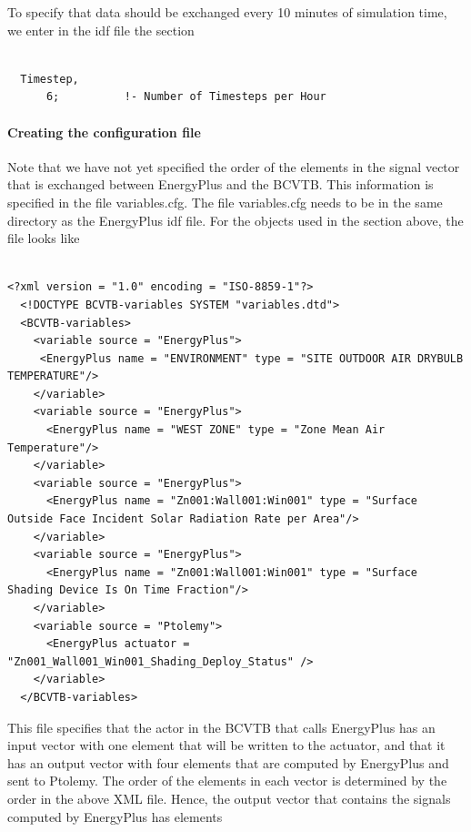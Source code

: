 To specify that data should be exchanged every 10 minutes of simulation time, we enter in the idf file the section

\begin{lstlisting}

  Timestep,
      6;          !- Number of Timesteps per Hour
\end{lstlisting}

\paragraph{\textbf{Creating the configuration file}}\label{creating-the-configuration-file-1}

Note that we have not yet specified the order of the elements in the signal vector that is exchanged between EnergyPlus and the BCVTB. This information is specified in the file variables.cfg. The file variables.cfg needs to be in the same directory as the EnergyPlus idf file. For the objects used in the section above, the file looks like

\begin{lstlisting}

<?xml version = "1.0" encoding = "ISO-8859-1"?>
  <!DOCTYPE BCVTB-variables SYSTEM "variables.dtd">
  <BCVTB-variables>
    <variable source = "EnergyPlus">
     <EnergyPlus name = "ENVIRONMENT" type = "SITE OUTDOOR AIR DRYBULB TEMPERATURE"/>
    </variable>
    <variable source = "EnergyPlus">
      <EnergyPlus name = "WEST ZONE" type = "Zone Mean Air Temperature"/>
    </variable>
    <variable source = "EnergyPlus">
      <EnergyPlus name = "Zn001:Wall001:Win001" type = "Surface Outside Face Incident Solar Radiation Rate per Area"/>
    </variable>
    <variable source = "EnergyPlus">
      <EnergyPlus name = "Zn001:Wall001:Win001" type = "Surface Shading Device Is On Time Fraction"/>
    </variable>
    <variable source = "Ptolemy">
      <EnergyPlus actuator = "Zn001_Wall001_Win001_Shading_Deploy_Status" />
    </variable>
  </BCVTB-variables>
\end{lstlisting}

This file specifies that the actor in the BCVTB that calls EnergyPlus has an input vector with one element that will be written to the actuator, and that it has an output vector with four elements that are computed by EnergyPlus and sent to Ptolemy. The order of the elements in each vector is determined by the order in the above XML file. Hence, the output vector that contains the signals computed by EnergyPlus has elements

